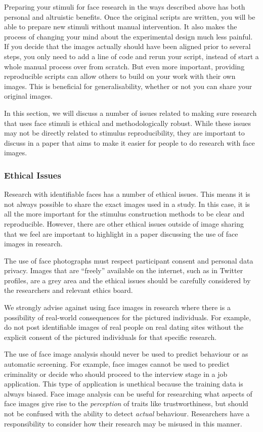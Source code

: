 \documentclass[
  doc,floatsintext]{apa6}
\begin{document}
Preparing your stimuli for face research in the ways described above has both personal and altruistic benefits. Once the original scripts are written, you will be able to prepare new stimuli without manual intervention. It also makes the process of changing your mind about the experimental design much less painful. If you decide that the images actually should have been aligned prior to several steps, you only need to add a line of code and rerun your script, instead of start a whole manual process over from scratch. But even more important, providing reproducible scripts can allow others to build on your work with their own images. This is beneficial for generalisability, whether or not you can share your original images.

In this section, we will discuss a number of issues related to making sure research that uses face stimuli is ethical and methodologically robust. While these issues may not be directly related to stimulus reproducibility, they are important to discuss in a paper that aims to make it easier for people to do research with face images.

\hypertarget{ethical-issues}{%
\subsubsection{Ethical Issues}\label{ethical-issues}}

Research with identifiable faces has a number of ethical issues. This means it is not always possible to share the exact images used in a study. In this case, it is all the more important for the stimulus construction methods to be clear and reproducible. However, there are other ethical issues outside of image sharing that we feel are important to highlight in a paper discussing the use of face images in research.

The use of face photographs must respect participant consent and personal data privacy. Images that are ``freely'' available on the internet, such as in Twitter profiles, are a grey area and the ethical issues should be carefully considered by the researchers and relevant ethics board.

We strongly advise against using face images in research where there is a possibility of real-world consequences for the pictured individuals. For example, do not post identifiable images of real people on real dating sites without the explicit consent of the pictured individuals for that specific research.

The use of face image analysis should never be used to predict behaviour or as automatic screening. For example, face images cannot be used to predict criminality or decide who should proceed to the interview stage in a job application. This type of application is unethical because the training data is always biased. Face image analysis can be useful for researching what aspects of face images give rise to the \emph{perception} of traits like trustworthiness, but should not be confused with the ability to detect \emph{actual} behaviour. Researchers have a responsibility to consider how their research may be misused in this manner.
\end{document}
